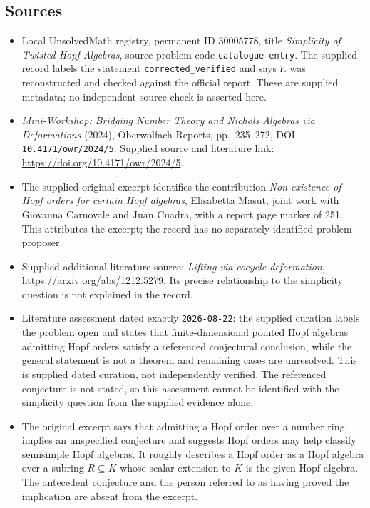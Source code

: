 \documentclass[11pt]{article}
\begin{document}
\subsection{Sources}
\begin{itemize}
\item Local UnsolvedMath registry, permanent ID \(30005778\), title \emph{Simplicity of Twisted Hopf Algebras}, source problem code \texttt{catalogue entry}. The supplied record labels the statement \texttt{corrected\_verified} and says it was reconstructed and checked against the official report. These are supplied metadata; no independent source check is asserted here.
\item \emph{Mini-Workshop: Bridging Number Theory and Nichols Algebras via Deformations} (2024), Oberwolfach Reports, pp.~235--272, DOI \texttt{10.4171/owr/2024/5}. Supplied source and literature link: \url{https://doi.org/10.4171/owr/2024/5}.
\item The supplied original excerpt identifies the contribution \emph{Non-existence of Hopf orders for certain Hopf algebras}, Elisabetta Masut, joint work with Giovanna Carnovale and Juan Cuadra, with a report page marker of 251. This attributes the excerpt; the record has no separately identified problem proposer.
\item Supplied additional literature source: \emph{Lifting via cocycle deformation}, \url{https://arxiv.org/abs/1212.5279}. Its precise relationship to the simplicity question is not explained in the record.
\item Literature assessment dated exactly \texttt{2026-08-22}: the supplied curation labels the problem open and states that finite-dimensional pointed Hopf algebras admitting Hopf orders satisfy a referenced conjectural conclusion, while the general statement is not a theorem and remaining cases are unresolved. This is supplied dated curation, not independently verified. The referenced conjecture is not stated, so this assessment cannot be identified with the simplicity question from the supplied evidence alone.
\item The original excerpt says that admitting a Hopf order over a number ring implies an unspecified conjecture and suggests Hopf orders may help classify semisimple Hopf algebras. It roughly describes a Hopf order as a Hopf algebra over a subring \(R\subseteq K\) whose scalar extension to \(K\) is the given Hopf algebra. The antecedent conjecture and the person referred to as having proved the implication are absent from the excerpt.
\end{itemize}
\end{document}
